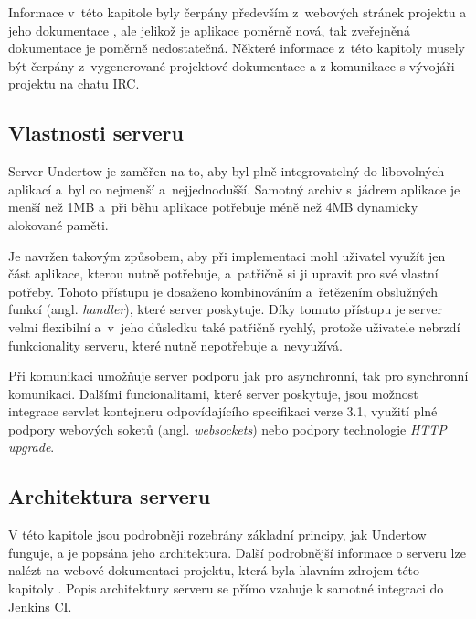         Informace v~této kapitole byly čerpány především z~webových stránek projektu \cite{undertowWeb} a 
        jeho dokumentace \cite{undertowDocs},
        ale jelikož je aplikace poměrně nová, tak zveřejněná dokumentace je poměrně nedostatečná. 
        Některé informace z~této kapitoly musely být čerpány
        z~vygenerované projektové dokumentace a z komunikace s vývojáři projektu
        na chatu IRC.

        \subsection{Vlastnosti serveru}
            Server Undertow je zaměřen na to, aby byl plně integrovatelný do libovolných aplikací
            a~byl co nejmenší a~nejjednodušší. Samotný
            archiv s~jádrem aplikace je menší než 1MB a~při běhu aplikace potřebuje
            méně než 4MB dynamicky alokované paměti. 

            Je navržen takovým způsobem, aby při implementaci mohl uživatel využít
            jen část aplikace, kterou nutně potřebuje, a~patřičně si ji upravit
            pro své vlastní potřeby.
            Tohoto přístupu je dosaženo kombinováním a~řetězením
            obslužných funkcí (angl. \emph{handler}), které server poskytuje.
            Díky tomuto přístupu je server velmi flexibilní a~v~jeho důsledku
            také patřičně rychlý, protože uživatele nebrzdí funkcionality
            serveru, které nutně nepotřebuje a~nevyužívá.
            
            Při komunikaci umožňuje server podporu jak pro asynchronní, tak
            pro synchronní komunikaci.
            Dalšími funcionalitami, které server poskytuje, jsou možnost integrace
            servlet kontejneru odpovídajícího specifikaci verze 3.1,
            využití plné podpory webových soketů (angl. \emph{websockets}) nebo 
            podpory technologie \emph{HTTP upgrade}.

        \subsection{Architektura serveru}
            V této kapitole jsou podrobněji rozebrány základní principy, jak Undertow funguje, 
            a je popsána jeho architektura. Další podrobnější informace o serveru 
            lze nalézt na webové dokumentaci projektu, která byla hlavním zdrojem této kapitoly \cite{undertowDocs}.
            Popis architektury serveru se přímo vzahuje k samotné integraci do Jenkins CI.

